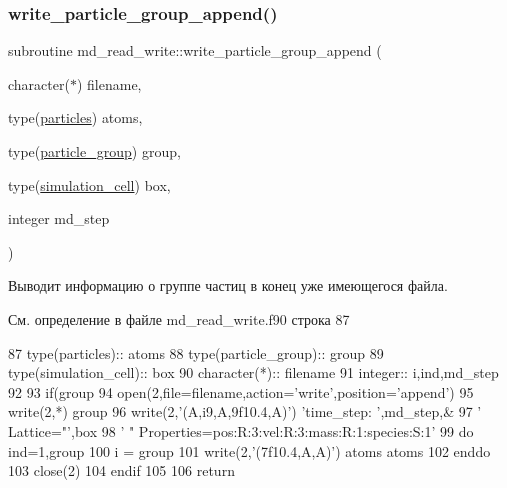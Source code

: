 \subsubsection{\texorpdfstring{write\+\_\+particle\+\_\+group\+\_\+append()}{write\_particle\_group\_append()}}
{\footnotesize\ttfamily subroutine md\+\_\+read\+\_\+write\+::write\+\_\+particle\+\_\+group\+\_\+append (\begin{DoxyParamCaption}\item[{character($\ast$)}]{filename,  }\item[{type(\mbox{\hyperlink{structmd__general_1_1particles}{particles}})}]{atoms,  }\item[{type(\mbox{\hyperlink{structmd__general_1_1particle__group}{particle\+\_\+group}})}]{group,  }\item[{type(\mbox{\hyperlink{structmd__general_1_1simulation__cell}{simulation\+\_\+cell}})}]{box,  }\item[{integer}]{md\+\_\+step }\end{DoxyParamCaption})}



Выводит информацию о группе частиц в конец уже имеющегося файла. 



См. определение в файле md\+\_\+read\+\_\+write.\+f90 строка 87


\begin{DoxyCode}
87     \textcolor{keywordtype}{type}(particles)::   atoms
88     \textcolor{keywordtype}{type}(particle\_group)::  group
89     \textcolor{keywordtype}{type}(simulation\_cell):: box
90     \textcolor{keywordtype}{character(*)}::  filename
91     \textcolor{keywordtype}{integer}::       i,ind,md\_step
92 
93     \textcolor{keywordflow}{if}(group%
94         \textcolor{keyword}{open}(2,file=filename,action=\textcolor{stringliteral}{'write'},position=\textcolor{stringliteral}{'append'})
95         \textcolor{keyword}{write}(2,*) group%
96         \textcolor{keyword}{write}(2,\textcolor{stringliteral}{'(A,i9,A,9f10.4,A)'}) \textcolor{stringliteral}{'time\_step: '},md\_step,&
97         \textcolor{stringliteral}{'    Lattice="'},box%
98         \textcolor{stringliteral}{' " Properties=pos:R:3:vel:R:3:mass:R:1:species:S:1'}
99         \textcolor{keywordflow}{do} ind=1,group%
100             i = group%
101             \textcolor{keyword}{write}(2,\textcolor{stringliteral}{'(7f10.4,A,A)'}) atoms%
      atoms%
102 \textcolor{keywordflow}{        enddo}
103         \textcolor{keyword}{close}(2)
104 \textcolor{keywordflow}{    endif}
105     
106     \textcolor{keywordflow}{return}
\end{DoxyCode}
